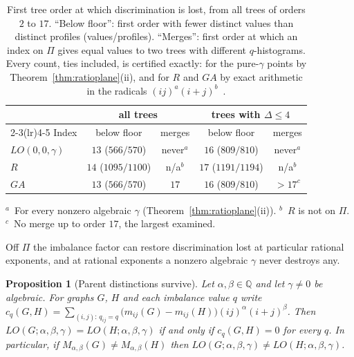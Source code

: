 \documentclass[a5paper, 10pt]{article}
\theoremstyle{plain}
\newtheorem{proposition}[theorem]{Proposition}
\theoremstyle{remark}
\theoremstyle{definition}
\begin{document}
\begin{table}[htbp]
\centering
\caption{First tree order at which discrimination is lost, from all trees
of orders $2$ to $17$. ``Below floor'': first order with fewer distinct
values than distinct profiles (values/profiles). ``Merges'': first order
at which an index on $\Pi$ gives equal values to two trees with
different $q$-histograms. Every count, ties included, is certified
exactly: for the pure-$\gamma$ points by Theorem~\ref{thm:ratioplane}(ii),
and for $R$ and $GA$ by exact arithmetic in the radicals
$(ij)^{a}(i+j)^{b}$~\cite{Besicovitch1940}.}
\label{tab:firstfail}
\small
\setlength{\tabcolsep}{3pt}
\begin{tabular}{lcccc}
\toprule
 & \multicolumn{2}{c}{all trees} & \multicolumn{2}{c}{trees with $\Delta \le 4$}\\
\cmidrule(lr){2-3}\cmidrule(lr){4-5}
Index & below floor & merges & below floor & merges\\
\midrule
$LO(0,0,\gamma)$ & $13$ ($566/570$) & never$^{a}$ & $16$ ($809/810$) & never$^{a}$\\
$R$ & $14$ ($1095/1100$) & n/a$^{b}$ & $17$ ($1191/1194$) & n/a$^{b}$\\
$GA$ & $13$ ($566/570$) & $17$ & $16$ ($809/810$) & $> 17^{c}$\\
\bottomrule
\end{tabular}

\smallskip
\begin{minipage}{0.95\linewidth}\footnotesize
$^{a}$~For every nonzero algebraic $\gamma$
(Theorem~\ref{thm:ratioplane}(ii)). $^{b}$~$R$ is not on $\Pi$.
$^{c}$~No merge up to order $17$, the largest examined.
\end{minipage}
\end{table}

Off $\Pi$ the imbalance factor can restore discrimination lost at
particular rational exponents, and at rational exponents a nonzero
algebraic $\gamma$ never destroys any.

  \begin{proposition}[Parent distinctions survive]\label{prop:offplane}
  Let $\alpha, \beta \in \mathbb{Q}$ and let $\gamma \ne 0$ be algebraic.
  For graphs $G$, $H$ and each imbalance value $q$ write
  $c_q(G,H) = \sum_{(i,j):\, q_{ij} = q} \bigl(m_{ij}(G) - m_{ij}(H)\bigr)
  (ij)^{\alpha} (i+j)^{\beta}$. Then
  $LO(G;\alpha,\beta,\gamma) = LO(H;\alpha,\beta,\gamma)$ if and only if
  $c_q(G,H) = 0$ for every $q$. In particular, if
  $M_{\alpha,\beta}(G) \ne M_{\alpha,\beta}(H)$ then
  $LO(G;\alpha,\beta,\gamma) \ne LO(H;\alpha,\beta,\gamma)$.
  \end{proposition}
\end{document}
